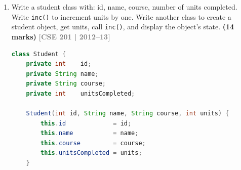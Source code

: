 \documentclass[12pt,a3paper]{article}
\newcommand{\yr}[1]{\hfill\textcolor{gray}{\small\textbf{[#1]}}}
\newcommand{\mk}[1]{\textcolor{orange!70!black}{\small\textbf{(#1 marks)}}}
\begin{document}
\begin{enumerate}
\begin{tcolorbox}[enhanced,breakable,ansbox,
  colback=cC!4,colframe=cC,boxrule=0.8pt,arc=5pt,
  title={\textbf{Answer --- Movie and MovieClub Classes}},
  fonttitle=\bfseries\color{white},colbacktitle=cC]
\begin{lstlisting}[language=Java]
class MovieClub {
    private ArrayList<Movie> movies = new ArrayList<>();

    void addMovie(Movie m)    { movies.add(m); }
    void removeMovie(Movie m) { movies.remove(m); }
    int  currentCount()       { return movies.size(); }

    void listMovies() {
        for (Movie m : movies) System.out.println(m);
    }
}

class MovieDemo {
    public static void main(String[] args) {
        Movie m1 = new Movie("Inception");
        m1.addDirector("Christopher Nolan");

        Movie m2 = new Movie("The Matrix");
        m2.addDirector("Lana Wachowski");
        m2.addDirector("Lilly Wachowski");

        MovieClub club = new MovieClub();
        club.addMovie(m1);
        club.addMovie(m2);

        System.out.println("Total movies: " + club.currentCount());
        m1.borrow();
        club.listMovies();
        m1.returnMovie();
        System.out.println("After return: " + club.currentCount());
    }
}
\end{lstlisting}
\textbf{Output:}
\begin{verbatim}
Total movies: 2
Inception [Christopher Nolan] [borrowed]
The Matrix [Lana Wachowski, Lilly Wachowski] [available]
After return: 2
\end{verbatim}
\end{tcolorbox}

\item Write a student class with: id, name, course, number of units completed. Write \texttt{inc()} to increment units by one. Write another class to create a student object, get units, call \texttt{inc()}, and display the object's state. \mk{14}
\yr{CSE 201 | 2012--13}

\begin{tcolorbox}[enhanced,breakable,ansbox,
  colback=cC!4,colframe=cC,boxrule=0.8pt,arc=5pt,
  title={\textbf{Answer --- Student Class with inc() Method}},
  fonttitle=\bfseries\color{white},colbacktitle=cC]
\begin{lstlisting}[language=Java]
class Student {
    private int    id;
    private String name;
    private String course;
    private int    unitsCompleted;

    Student(int id, String name, String course, int units) {
        this.id             = id;
        this.name           = name;
        this.course         = course;
        this.unitsCompleted = units;
    }


\end{lstlisting}
\end{tcolorbox}
\end{enumerate}
\end{document}

